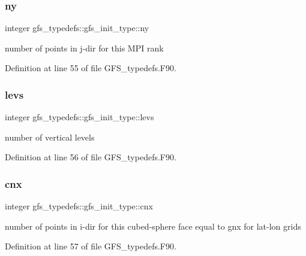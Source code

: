 \subsubsection{ny}
{\footnotesize\ttfamily integer gfs\+\_\+typedefs\+::gfs\+\_\+init\+\_\+type\+::ny}



number of points in j-\/dir for this M\+PI rank 



Definition at line 55 of file G\+F\+S\+\_\+typedefs.\+F90.

\mbox{\label{structgfs__typedefs_1_1gfs__init__type_ad5788ad2561bdf0bd54d386e7dc967cc}} 
\subsubsection{levs}
{\footnotesize\ttfamily integer gfs\+\_\+typedefs\+::gfs\+\_\+init\+\_\+type\+::levs}



number of vertical levels 



Definition at line 56 of file G\+F\+S\+\_\+typedefs.\+F90.

\mbox{\label{structgfs__typedefs_1_1gfs__init__type_aae98d6cdff38883148f556601523acf2}} 
\subsubsection{cnx}
{\footnotesize\ttfamily integer gfs\+\_\+typedefs\+::gfs\+\_\+init\+\_\+type\+::cnx}



number of points in i-\/dir for this cubed-\/sphere face equal to gnx for lat-\/lon grids 



Definition at line 57 of file G\+F\+S\+\_\+typedefs.\+F90.

\mbox{\label{structgfs__typedefs_1_1gfs__init__type_a80369546bbf4e44ea5d5ca7e21ef909c}} 
